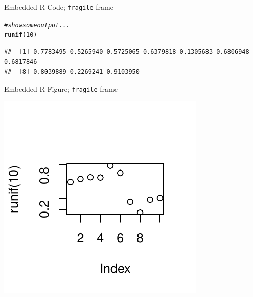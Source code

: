 \documentclass[12pt]{beamer}\usepackage[]{graphicx}\usepackage[]{color}
\makeatletter
\def\maxwidth{ %
  \ifdim\Gin@nat@width>\linewidth
    \linewidth
  \else
    \Gin@nat@width
  \fi
}
\newcommand{\hlnum}[1]{\textcolor[rgb]{0.686,0.059,0.569}{#1}}%
\newcommand{\hlcom}[1]{\textcolor[rgb]{0.678,0.584,0.686}{\textit{#1}}}%
\newcommand{\hlstd}[1]{\textcolor[rgb]{0.345,0.345,0.345}{#1}}%
\newcommand{\hlkwd}[1]{\textcolor[rgb]{0.737,0.353,0.396}{\textbf{#1}}}%
\newenvironment{kframe}{%
 \def\at@end@of@kframe{}%
 \ifinner\ifhmode%
  \def\at@end@of@kframe{\end{minipage}}%
  \begin{minipage}{\columnwidth}%
 \fi\fi%
 \def\FrameCommand##1{\hskip\@totalleftmargin \hskip-\fboxsep
 \colorbox{shadecolor}{##1}\hskip-\fboxsep
     \hskip-\linewidth \hskip-\@totalleftmargin \hskip\columnwidth}%
 \MakeFramed {\advance\hsize-\width
   \@totalleftmargin\z@ \linewidth\hsize
   \@setminipage}}%
 {\par\unskip\endMakeFramed%
 \at@end@of@kframe}
\newenvironment{knitrout}{}{} %
\makeatother
\begin{document}
\begin{frame}[fragile]{Embedded R Code; \texttt{fragile} frame}
\begin{block}

\begin{knitrout}
\color{fgcolor}\begin{kframe}
\begin{alltt}
\hlcom{# show some output...}
\hlkwd{runif}\hlstd{(}\hlnum{10}\hlstd{)}
\end{alltt}
\begin{verbatim}
##  [1] 0.7783495 0.5265940 0.5725065 0.6379818 0.1305683 0.6806948 0.6817846
##  [8] 0.8039889 0.2269241 0.9103950
\end{verbatim}
\end{kframe}
\end{knitrout}

\end{block}
\end{frame}

\begin{frame}[fragile]{Embedded R Figure; \texttt{fragile} frame}

\begin{knitrout}
\color{fgcolor}

{\centering \includegraphics[width=\maxwidth]{figure/unnamed-chunk-2-1} 

}



\end{knitrout}

\end{frame}
\end{document}
